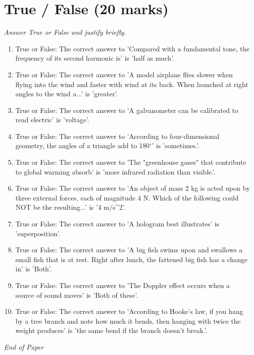 \documentclass[12pt]{article}
\begin{document}
\section*{True / False (20 marks)}
\textit{Answer True or False and justify briefly.}
\begin{enumerate}[label=\arabic*.]
\item True or False: The correct answer to 'Compared with a fundamental tone, the frequency of its second harmonic is' is 'half as much'.
\item True or False: The correct answer to 'A model airplane flies slower when flying into the wind and faster with wind at its back. When launched at right angles to the wind a...' is 'greater'.
\item True or False: The correct answer to 'A galvanometer can be calibrated to read electric' is 'voltage'.
\item True or False: The correct answer to 'According to four-dimensional geometry, the angles of a triangle add to 180$^\circ$' is 'sometimes.'.
\item True or False: The correct answer to 'The "greenhouse gases" that contribute to global warming absorb' is 'more infrared radiation than visible.'.
\item True or False: The correct answer to 'An object of mass 2 kg is acted upon by three external forces, each of magnitude 4 N. Which of the following could NOT be the resulting...' is '4 m/s\^{}2'.
\item True or False: The correct answer to 'A hologram best illustrates' is 'superposition'.
\item True or False: The correct answer to 'A big fish swims upon and swallows a small fish that is at rest. Right after lunch, the fattened big fish has a change in' is 'Both'.
\item True or False: The correct answer to 'The Doppler effect occurs when a source of sound moves' is 'Both of these'.
\item True or False: The correct answer to 'According to Hooke's law, if you hang by a tree branch and note how much it bends, then hanging with twice the weight produces' is 'the same bend if the branch doesn't break.'.
\end{enumerate}

\vfill
\noindent\textit{End of Paper}
\end{document}
